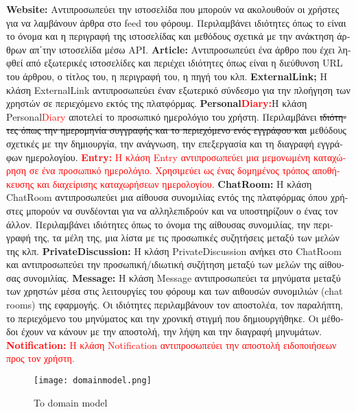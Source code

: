 \documentclass{article}
\begin{document}
\textbf{Website:} \textgreek{Αντιπροσωπεύει την ιστοσελίδα που μπορούν να ακολουθούν οι χρήστες για να λαμβάνουν άρθρα στο} feed \textgreek{του φόρουμ. Περιλαμβάνει ιδιότητες όπως το είναι το όνομα και η περιγραφή της ιστοσελίδας και μεθόδους σχετικά με την ανάκτηση άρθρων απ΄την ιστοσελίδα μέσω} API.
\newline
\newline
\textbf{Article:} \textgreek{Αντιπροσωπεύει ένα άρθρο που έχει ληφθεί από εξωτερικές ιστοσελίδες και περιέχει ιδιότητες όπως είναι η διεύθυνση} URL \textgreek{του άρθρου, ο τίτλος του, η περιγραφή του, η πηγή του κλπ.}
\newline
\newline
\textbf{ExternalLink;} \textgreek{Η κλάση} ExternalLink \textgreek{αντιπροσωπεύει έναν εξωτερικό σύνδεσμο για την πλοήγηση των χρηστών σε περιεχόμενο εκτός της πλατφόρμας.}
\newline
\newline
\textbf{Personal\textcolor{red}{Diary:}}\textgreek{Η κλάση} Personal\textcolor{red}{Diary} \textgreek{αποτελεί το προσωπικό ημερολόγιο του χρήστη. Περιλαμβάνει \st{ιδιότητες όπως την ημερομηνία συγγραφής και το περιεχόμενο ενός εγγράφου και} μεθόδους σχετικές με την δημιουργία, την ανάγνωση, την επεξεργασία και τη διαγραφή εγγράφων ημερολογίου.}
\newline
\newline
\textcolor{red}{\textbf{Entry:} \textgreek{Η κλάση} Entry \textgreek{αντιπροσωπεύει μια μεμονωμένη καταχώρηση σε ένα προσωπικό ημερολόγιο. Χρησιμεύει ως ένας δομημένος τρόπος αποθήκευσης και διαχείρισης καταχωρήσεων ημερολογίου.}}
\newline
\newline
\textbf{ChatRoom:} \textgreek{Η κλάση} ChatRoom \textgreek{αντιπροσωπεύει μια αίθουσα συνομιλίας εντός της πλατφόρμας όπου χρήστες μπορούν να συνδέονται για να αλληλεπιδρούν και να υποστηρίζουν ο ένας τον άλλον. Περιλαμβάνει ιδιότητες όπως το όνομα της αίθουσας συνομιλίας, την περιγραφή της, τα μέλη της, μια λίστα με τις προσωπικές συζητήσεις μεταξύ των μελών της κλπ.}
\newline
\newline
\textbf{PrivateDiscussion:} \textgreek{Η κλάση} PrivateDiscussion \textgreek{ανήκει στο} ChatRoom \textgreek{και αντιπροσωπεύει την προσωπική/ιδιωτική συζήτηση μεταξύ των μελών της αίθουσας συνομιλίας.}
\newline
\newline
\textbf{Message:} \textgreek{Η κλάση} Message \textgreek{αντιπροσωπεύει τα μηνύματα μεταξύ των χρηστών μέσα στις λειτουργίες του φόρουμ και των αιθουσών συνομιλιών} (chat rooms) \textgreek{της εφαρμογής. Οι ιδιότητες περιλαμβάνουν τον αποστολέα, τον παραλήπτη, το περιεχόμενο του μηνύματος και την χρονική στιγμή που δημιουργήθηκε. Οι μέθοδοι έχουν να κάνουν με την αποστολή, την λήψη και την διαγραφή μηνυμάτων.}
\newline
\newline
\textcolor{red}{\textbf{Notification:} \textgreek{Η κλάση} Notification \textgreek{αντιπροσωπεύει την αποστολή ειδοποιήσεων προς τον χρήστη.}}
\newline
\newline

\newpage

\begin{figure}
    \centering
    \texttt{[image: domainmodel.png]}
    \caption{To domain model}
    \label{fig:enter-label}
\end{figure}
\end{document}
